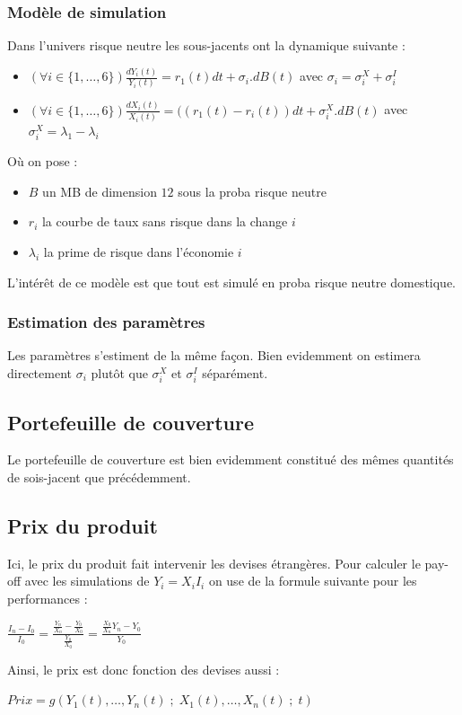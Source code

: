 \documentclass[a4paper,12pt]{article}
\begin{document}
\subsubsection{Modèle de simulation}
Dans l'univers risque neutre les sous-jacents ont la dynamique suivante : 
\begin{itemize}[label=$\star$]
\item $\left(\forall i\in\{1,\ldots,6\}\right) \frac{dY_i(t)}{Y_i(t)}=r_1(t)dt + \sigma_i.dB(t)$ avec $\sigma_i=\sigma^X_i+\sigma^I_i$
\item $\left(\forall i\in\{1,\ldots,6\}\right) \frac{dX_i(t)}{X_i(t)}=((r_1(t)-r_i(t))dt+\sigma^X_i.dB(t)$ avec $\sigma^X_i= \lambda_1-\lambda_i$
\end{itemize}
Où on pose : 
\begin{itemize}[label=$\bullet$]
\item $B$ un MB de dimension $12$ sous la proba risque neutre
\item $r_i$ la courbe de taux sans risque dans la change $i$
\item $\lambda_i$ la prime de risque dans l'économie $i$
\end{itemize}
L'intérêt de ce modèle est que tout est simulé en proba risque neutre domestique.
\subsubsection{Estimation des paramètres}
Les paramètres s'estiment de la même façon. Bien evidemment on estimera directement $\sigma_i$ plutôt que $\sigma^X_i$ et $\sigma^I_i$ séparément. 
\subsection{Portefeuille de couverture}
Le portefeuille de couverture est bien evidemment constitué des mêmes quantités de sois-jacent que précédemment.
\subsection{Prix du produit}
Ici, le prix du produit fait intervenir les devises étrangères. Pour calculer le pay-off avec les simulations de $Y_i=X_iI_i$ on use de la formule suivante pour les performances : 
\begin{center}
$\frac{I_n-I_0}{I_0}=\frac{\frac{Y_n}{X_n}-\frac{Y_0}{X_0}}{\frac{Y_0}{X_0}}=\frac{\frac{X_0}{X_n}Y_n-Y_0}{Y_0}$
\end{center}
Ainsi, le prix est donc fonction des devises aussi : 
\begin{center}
$Prix = g(Y_1(t),\ldots,Y_n(t)\;;\;X_1(t),\ldots,X_n(t)\;;\;t)$
\end{center}
\newpage
\end{document}
